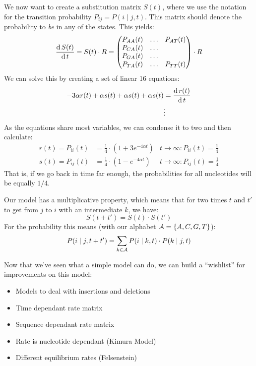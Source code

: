 We now want to create a substitution matrix \(S(t)\), where we use the
notation for the transition probability \(P_{ij}=P(i\mid j,t)\).
This matrix should denote the probability to \emph{be} in any of the states.
This yields:
\[
  \frac{\operatorname{d} S(t)}{\operatorname{d} t} = S(t) \cdot R = 
  \begin{pmatrix}
      P_{AA}(t) & \hdots & P_{AT}(t) \\
      P_{CA}(t) & \hdots &           \\
      P_{GA}(t) & \hdots &           \\
      P_{TA}(t) & \hdots & P_{TT}(t) \\
  \end{pmatrix} \cdot R
\]
We can solve this by creating a set of linear 16 equations:
\begin{align*}
  -3\alpha r(t) + \alpha s(t) + \alpha s(t) + \alpha s(t) &= \frac{\operatorname{d} r(t)}{\operatorname{d} t} \\
  &\vdots
\end{align*}
As the equations share most variables, we can condense it to two and then
calculate:
\begin{align*}
  r(t) = P_{ii}(t) &= \frac{1}{4}\cdot (1+3e^{-4\alpha t}) & t\to\infty: P_{ii}(t) = \frac{1}{4} \\
  s(t) = P_{ij}(t) &= \frac{1}{4}\cdot (1- e^{-4\alpha t}) & t\to\infty: P_{ij}(t) = \frac{1}{4}
\end{align*}
That is, if we go back in time far enough, the probabilities for all
nucleotides will be equally \(1/4\).

Our model has a multiplicative property, which means that for two times
\(t\) and \(t'\) to get from \(j\) to \(i\) with an intermediate \(k\), we
have:
\[
  S(t+t') = S(t)\cdot S(t')
\]
For the probability this means (with our alphabet \(\mathcal{A}=\{A,C,G,T\}\)):
\[
  P(i\mid j, t+t') = \sum_{k\in\mathcal{A}} P(i\mid k,t) \cdot P(k\mid j, t)
\]

Now that we've seen what a simple model can do, we can build a
\enquote{wishlist} for improvements on this model:
\begin{itemize}
\item Models to deal with insertions and deletions
\item Time dependant rate matrix
\item Sequence dependant rate matrix
\item Rate is nucleotide dependant (Kimura Model)
\item Different equilibrium rates (Felsenstein)
\end{itemize}

